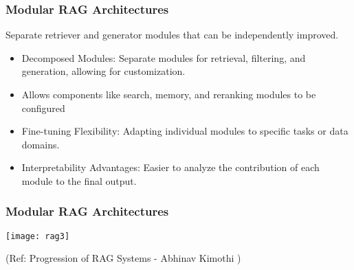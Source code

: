 \begin{frame}[fragile]\frametitle{Modular RAG Architectures}

Separate retriever and generator modules that can be independently improved.

\begin{itemize}
\item Decomposed Modules: Separate modules for retrieval, filtering, and generation, allowing for customization.
\item Allows components like search, memory, and reranking modules to be configured
\item Fine-tuning Flexibility: Adapting individual modules to specific tasks or data domains.
\item Interpretability Advantages: Easier to analyze the contribution of each module to the final output.
\end{itemize}	

\end{frame}



\begin{frame}[fragile]\frametitle{Modular RAG Architectures}

\begin{center}
\texttt{[image: rag3]}

{\tiny (Ref: Progression of RAG Systems - Abhinav Kimothi )}
\end{center}

\end{frame}

